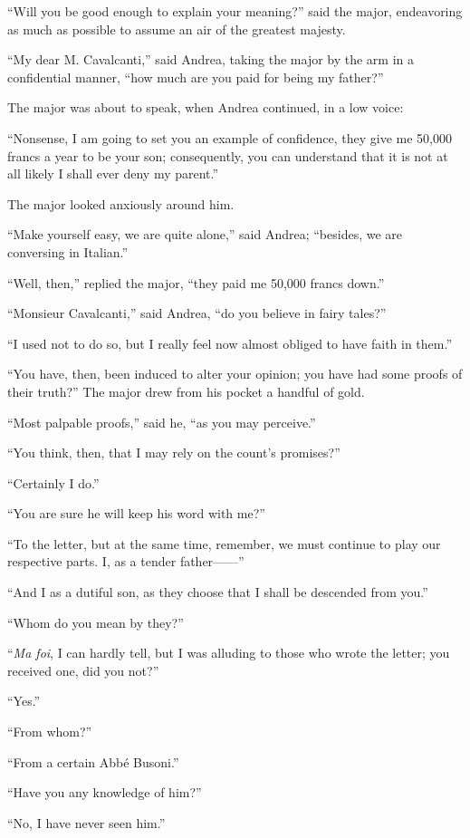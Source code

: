 “Will you be good enough to explain your meaning?” said the major,
endeavoring as much as possible to assume an air of the greatest
majesty.

“My dear M. Cavalcanti,” said Andrea, taking the major by the arm in a
confidential manner, “how much are you paid for being my father?”

The major was about to speak, when Andrea continued, in a low voice:

“Nonsense, I am going to set you an example of confidence, they give me
50,000 francs a year to be your son; consequently, you can understand
that it is not at all likely I shall ever deny my parent.”

The major looked anxiously around him.

“Make yourself easy, we are quite alone,” said Andrea; “besides, we are
conversing in Italian.”

“Well, then,” replied the major, “they paid me 50,000 francs down.”

“Monsieur Cavalcanti,” said Andrea, “do you believe in fairy tales?”

“I used not to do so, but I really feel now almost obliged to have
faith in them.”

“You have, then, been induced to alter your opinion; you have had some
proofs of their truth?” The major drew from his pocket a handful of
gold.

“Most palpable proofs,” said he, “as you may perceive.”

“You think, then, that I may rely on the count’s promises?”

“Certainly I do.”

“You are sure he will keep his word with me?”

“To the letter, but at the same time, remember, we must continue to
play our respective parts. I, as a tender father——”

“And I as a dutiful son, as they choose that I shall be descended from
you.”

“Whom do you mean by they?”

“\textit{Ma foi}, I can hardly tell, but I was alluding to those who wrote the
letter; you received one, did you not?”

“Yes.”

“From whom?”

“From a certain Abbé Busoni.”

“Have you any knowledge of him?”

“No, I have never seen him.”

